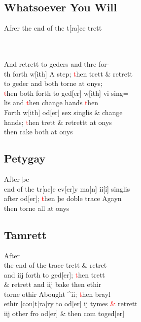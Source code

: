 \documentclass[12pt,letter]{article} %
\newcommand{\red}[1]{\textcolor{red}{#1}}
\newcommand{\srcpg}[1]{
    \noindent{
        \color{Gray}{\rule[0.5ex]{\linewidth}{1pt}~#1} 
    
    }
}
\begin{document}
\subsection{Whatsoever You Will}
Afrer the end of the t{[}ra{]}ce trett \\
\ 
\srcpg{62}
\ \\
And retrett to geders and thre for-\\
th forth w{[}ith{]} A step; \red{t}hen trett \& retrett\\
to geder and both torne at onys;\\
\red{t}hen both forth to ged{[}er{]} w{[}ith{]} vi sing=\\
lis and \red{t}hen change hands \red{t}hen\\
Forth w{[}ith{]} od{[}er{]} sex singlis \& change\\
hands; \red{t}hen trett \& retrettt at onys\\
then rake both at onys

\subsection{Petygay}
After þe\\
end of the tr{[}ac{]}e ev{[}er{]}y ma{[}n{]} ii{[}i{]} singlis\\
after od{[}er{]}; \red{t}hen þe doble trace Agayn\\
then torne all at onys

\subsection{Tamrett}
After\\
the end of the trace trett \& retret\\
and iij forth to ged{[}er{]}; \red{t}hen trett\\
\& retrett and iij bake then ethir\\
torne othir Abought \^{}ii; \red{t}hen brayl\\
ethir {[}con{]}t{[}ra{]}ry to od{[}er{]} ij tymes \red{\&} retrett\\
iij other fro od{[}er{]} \& then com toged{[}er{]}\marginnote{1}
\end{document}

